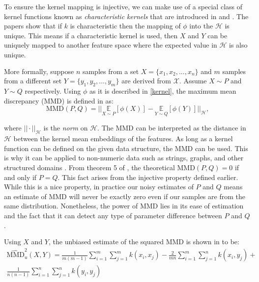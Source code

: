 To ensure the kernel mapping is injective, we can make use of a special class of kernel functions known as \textit{characteristic kernels} that are introduced in \cite{fukumizu2008kernel} and \cite{sriperumbudur2011universality}. The papers show that if $k$ is characteristic then the mapping of $\phi$ into the $\mathcal{H}$ is unique. This means if a characteristic kernel is used, then $X$ and $Y$ can be uniquely mapped to another feature space where the expected value in $\mathcal{H}$ is also unique.  %


More formally, suppose $n$ samples from a set $X = \{x_1, x_2, ..., x_n\}$ and $m$ samples from a different set $Y=\{y_1, y_2, ..., y_m\}$ are derived from $\mathcal{X}$. Assume $X \sim  P$ and $Y \sim Q$ respectively. Using $\phi$ as it is described in \ref{kernel}, the maximum mean discrepancy (MMD) is defined in \cite{smola2007hilbert} as:
\begin{equation}
\label{mmd_theory}
\text{MMD}(P,Q)=|| \underset{X \sim P}{\mathbb{E}}[\phi(X)] -  \underset{Y \sim Q}{\mathbb{E}}[\phi(Y)]||_\mathcal{H},
\end{equation}

where $||\cdot||_\mathcal{H}$ is the \textit{norm} on $\mathcal{H}$. The MMD can be interpreted as the distance in $\mathcal{H}$ between the kernel mean embeddings of the features. As long as a kernel function can be defined on the given data structure, the MMD can be used. This is why it can be applied to non-numeric data such as strings, graphs, and other structured domains \cite{hofmann2008kernel}. From theorem 5 of \cite{gretton2012kernel}, the theoretical MMD$(P,Q) = 0$ if and only if $P=Q$. This fact arises from the injective property defined earlier. While this is a nice property, in practice our noisy estimates of $P$ and $Q$ means an estimate of MMD will never be exactly zero even if our samples are from the same distribution. Nonetheless, the power of MMD lies in its ease of estimation and the fact that it can detect any type of parameter difference between $P$ and $Q$. 

Using $X$ and $Y$, the unbiased estimate of the squared MMD is shown in \cite{gretton2012kernel} to be:
\begin{equation}
\label{mmd_unbiased}
\begin{split}
\widehat{\text{MMD}}_{u}^{2}(X, Y)=\frac{1}{m(m-1)} \sum_{i=1}^m \sum_{ j=1}^{m} k\left(x_{i}, x_{j}\right)-\frac{2}{m n} \sum_{i=1}^m \sum_{ j=1}^{n} k\left(x_{i}, y_{j}\right)+ \\
\frac{1}{n(n-1)} \sum_{i=1}^n \sum_{j=1}^{n} k\left(y_{i}, y_{j}\right)
\end{split}
\end{equation}

